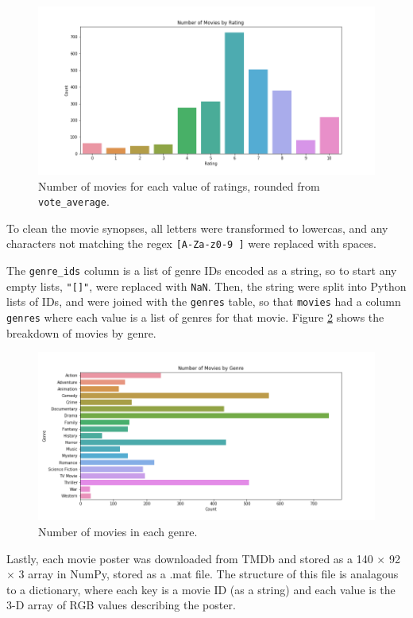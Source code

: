 \documentclass[12pt, oneside]{article}   	%
\begin{document}
\begin{figure}
\includegraphics[width=\textwidth]{rating_barplot}
\caption{\label{fig:rating_barplot}Number of movies for each value of ratings, rounded from \texttt{vote\_average}.}
\end{figure}

To clean the movie synopses, all letters were transformed to lowercas, and any characters not matching the regex \texttt{[A-Za-z0-9 ]} were replaced with spaces.

The \texttt{genre\_ids} column is a list of genre IDs encoded as a string, so to start any empty lists, \texttt{"[]"}, were replaced with \texttt{NaN}. Then, the string were split into Python lists of IDs, and were joined with the \texttt{genres} table, so that \texttt{movies} had a column \texttt{genres} where each value is a list of genres for that movie. Figure \ref{fig:genre_barplot} shows the breakdown of movies by genre.

\begin{figure}
\includegraphics[width=\textwidth]{genre_barplot}
\caption{\label{fig:genre_barplot}Number of movies in each genre.}
\end{figure}

Lastly, each movie poster was downloaded from TMDb and stored as a 140 $\times$ 92 $\times$ 3 array in NumPy, stored as a .mat file. The structure of this file is analagous to a dictionary, where each key is a movie ID (as a string) and each value is the 3-D array of RGB values describing the poster.
\end{document}
